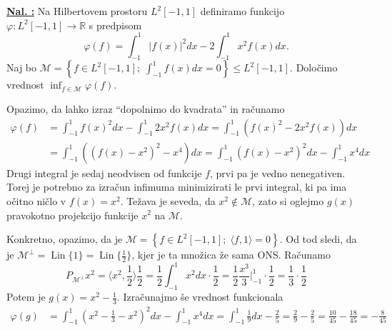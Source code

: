 \documentclass[a4paper, 12pt]{article}
\DeclareMathOperator{\Lin}{Lin}
\newcommand{\R}{\mathbb{R}}
\newcounter{excounter}[section]
\newenvironment{Exercise}
    {\refstepcounter{excounter}\underline{\textbf{Nal. \theexcounter:}}}
    {\par\vspace{\baselineskip}}
\begin{document}
\begin{Exercise}
    Na Hilbertovem prostoru $L^2[-1, 1]$ definiramo funkcijo $\varphi\colon L^2[-1,1] \to \R$ s predpisom
    \[
        \varphi(f) = \int_{-1}^{1} |f(x)|^2 dx - 2 \int_{-1}^{1} x^2f(x)dx.
    \]
    Naj bo $\mathcal{M} = \left\{ f \in L^2[-1, 1] ; \; \int_{-1}^{1}f(x)dx = 0 \right\} \leq L^2[-1, 1]$.
    Določimo vrednost $\inf_{f \in \mathcal{M}} \varphi(f)$.

    Opazimo, da lahko izraz ``dopolnimo do kvadrata'' in računamo
    \begin{align*}
        \varphi(f) &= \int_{-1}^{1} f(x)^2 dx - \int_{-1}^{1} 2x^2f(x)dx
        = \int_{-1}^{1} \left( f(x)^2 - 2x^2f(x) \right)dx \\
        &= \int_{-1}^{1} \left( \left( f(x) - x^2 \right)^2 - x^4 \right)dx
        = \int_{-1}^{1} \left( f(x) - x^2 \right)^2 dx - \int_{-1}^{1} x^4 dx
    \end{align*}
    Drugi integral je sedaj neodvisen od funkcije $f$,
    prvi pa je vedno nenegativen.
    Torej je potrebno za izračun infimuma minimizirati le prvi integral,
    ki pa ima očitno ničlo v $f(x) = x^2$.
    Težava je seveda, da $x^2 \notin \mathcal{M}$,
    zato si oglejmo $g(x)$ pravokotno projekcijo funkcije $x^2$ na $\mathcal{M}$.

    Konkretno, opazimo, da je $\mathcal{M} = \left\{ f \in L^2[-1, 1] ; \; \langle f, 1 \rangle = 0 \right\}$.
    Od tod sledi, da je $\mathcal{M}^\perp = \Lin\lbrace1\rbrace = \Lin\lbrace\frac{1}{2}\rbrace$,
    kjer je ta množica že sama ONS.
    Računamo
    \[
        P_{\mathcal{M}^\perp} x^2 = \langle x^2, \frac{1}{2} \rangle \frac{1}{2}
        = \frac{1}{2}\int_{-1}^{1}x^2dx \cdot \frac{1}{2}
        = \frac{1}{2}\frac{x^3}{3}\Big|_{-1}^1 \cdot \frac{1}{2}
        = \frac{1}{3} \cdot \frac{1}{2}
    \]
    Potem je $g(x) = x^2 - \frac{1}{3}$.
    Izračunajmo še vrednost funkcionala
    \begin{align*}
        \varphi(g) &= \int_{-1}^{1}\left( x^2 - \frac{1}{3} - x^2 \right)^2 dx - \int_{-1}^{1}x^4dx
        = \int_{-1}^{1}\frac{1}{9} dx - \frac{2}{5}
        = \frac{2}{9} - \frac{2}{5}
        = \frac{10}{45} - \frac{18}{45} = -\frac{8}{45}
    \end{align*}
\end{Exercise}
\end{document}
